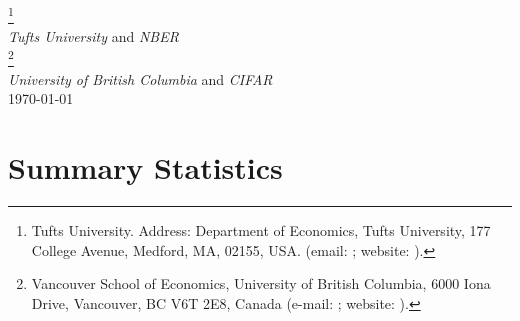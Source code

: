 \documentclass[pdf,letterpaper,11pt]{article}
\begin{document}
\begin{titlepage}
\begin{minipage}{\textwidth}
\begin{center}%
%
\vspace{1mm} {\LARGE{}}\\[6ex]

{\Large{}\footnote[1]{Tufts University. Address: Department of Economics, Tufts University, 177 College Avenue, Medford, MA, 02155, USA. (email: ; website: ).}}\\[1mm]
{\large\textit{Tufts University} and \textit{NBER}}\\[2ex]

{\Large{}\footnote[2]{Vancouver School of Economics,
University of British Columbia, 6000 Iona Drive, Vancouver, BC
V6T 2E8, Canada (e-mail: ; website:
).}}\\[1mm]
{\large\textit{University of British Columbia} and \textit{CIFAR}}\\[2ex]
%
\today \vspace{0.5ex} \\
%
\end{center}
%
\end{minipage}
\end{titlepage}

\onehalfspacing

\section{Summary Statistics}

\begin{table}  [H]  \centering
   \begin{scriptsize}
\begin{threeparttable}
\caption*{Table A3: Descriptive Statistics}
 
 
 
 
    \end{threeparttable}
       \end{scriptsize}
\end{table}

\begin{table}  [H]  \centering
   \begin{scriptsize}
\begin{threeparttable}
\caption*{Table A4: Balance Table}
 
 
 
 
    \end{threeparttable}
       \end{scriptsize}
\end{table}
\end{document}
